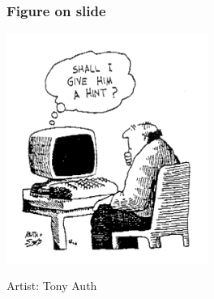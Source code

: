 \documentclass[english]{beamer}
\begin{document}
\begin{frame}
\frametitle{Figure on slide}
\begin{center}
\includegraphics[height=7.5cm]{shall_i_give_him_a_hint.png}
\end{center}
\vspace{-6mm}
\tiny Artist: Tony Auth
\end{frame}
\end{document}

